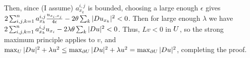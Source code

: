 Then, since (I assume) $a^{i, j}_{x_k}$ is bounded, choosing a large enough $\epsilon$ gives
$2 \sum_{i, j, k = 1}^{n} a^{i, j}_{x_k} \frac{u_{x_i, x_j}}{4 \epsilon} - 2 \theta \sum_{k} |D u_{x_k}|^2 < 0$.
Then for large enough $\lambda$ we have $2 \sum_{i, j, k = 1}^{n} a^{i, j}_{x_k} u_{x_i} - 2 \lambda \theta \sum_{k} |D u|^2 < 0$.
Thus, $L v < 0$ in $U$, so the strong maximum principle applies to $v$,
and $\max_{U} |D u|^2 + \lambda u^2 \leq \max_{\partial U} |D u|^2 + \lambda u^2 = \max_{\partial U} |D u|^2$,
completing the proof.
